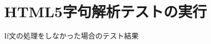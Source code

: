 \documentclass[uplatex,a4j]{jsreport}
\begin{document}
\section{HTML5字句解析テストの実行}
If文の処理をしなかった場合のテスト結果
\end{document}
